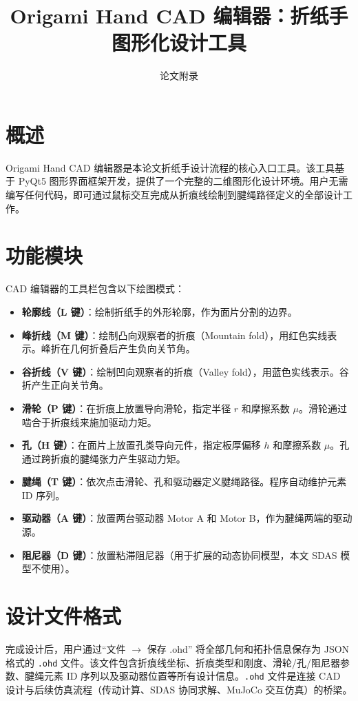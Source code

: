 \documentclass[12pt,a4paper]{article}
\title{Origami Hand CAD 编辑器：折纸手图形化设计工具}
\author{论文附录}
\date{}
\begin{document}
\maketitle

\section{概述}

Origami Hand CAD 编辑器是本论文折纸手设计流程的核心入口工具。该工具基于 PyQt5 图形界面框架开发，提供了一个完整的二维图形化设计环境。用户无需编写任何代码，即可通过鼠标交互完成从折痕线绘制到腱绳路径定义的全部设计工作。

\section{功能模块}

CAD 编辑器的工具栏包含以下绘图模式：

\begin{itemize}
    \item \textbf{轮廓线（L 键）}：绘制折纸手的外形轮廓，作为面片分割的边界。
    \item \textbf{峰折线（M 键）}：绘制凸向观察者的折痕（Mountain fold），用红色实线表示。峰折在几何折叠后产生负向关节角。
    \item \textbf{谷折线（V 键）}：绘制凹向观察者的折痕（Valley fold），用蓝色实线表示。谷折产生正向关节角。
    \item \textbf{滑轮（P 键）}：在折痕上放置导向滑轮，指定半径 $r$ 和摩擦系数 $\mu$。滑轮通过啮合于折痕线来施加驱动力矩。
    \item \textbf{孔（H 键）}：在面片上放置孔类导向元件，指定板厚偏移 $h$ 和摩擦系数 $\mu$。孔通过跨折痕的腱绳张力产生驱动力矩。
    \item \textbf{腱绳（T 键）}：依次点击滑轮、孔和驱动器定义腱绳路径。程序自动维护元素 ID 序列。
    \item \textbf{驱动器（A 键）}：放置两台驱动器 Motor A 和 Motor B，作为腱绳两端的驱动源。
    \item \textbf{阻尼器（D 键）}：放置粘滞阻尼器（用于扩展的动态协同模型，本文 SDAS 模型不使用）。
\end{itemize}

\section{设计文件格式}

完成设计后，用户通过``文件 $\to$ 保存 .ohd'' 将全部几何和拓扑信息保存为 JSON 格式的 \texttt{.ohd} 文件。该文件包含折痕线坐标、折痕类型和刚度、滑轮/孔/阻尼器参数、腱绳元素 ID 序列以及驱动器位置等所有设计信息。\texttt{.ohd} 文件是连接 CAD 设计与后续仿真流程（传动计算、SDAS 协同求解、MuJoCo 交互仿真）的桥梁。
\end{document}
